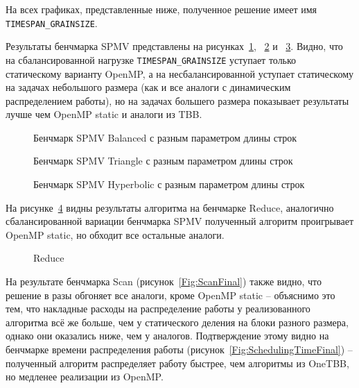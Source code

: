 \documentclass[times,specification,annotation]{itmo-student-thesis}
\begin{document}
На всех графиках, представленные ниже, полученное решение имеет имя \texttt{TIMESPAN\_GRAINSIZE}.

Результаты бенчмарка SPMV представлены на рисунках~\ref{Fig:SpmvBalancedFinal}, ~\ref{Fig:SpmvTriangleFinal} и ~\ref{Fig:SpmvHyperFinal}. Видно, что на сбалансированной нагрузке \texttt{TIMESPAN\_GRAINSIZE} уступает только статическому варианту OpenMP, а на несбалансированной уступает статическому на задачах небольшого размера (как и все аналоги с динамическим распределением работы), но на задачах большего размера показывает результаты лучше чем OpenMP static и аналоги из TBB. 

\begin{figure}[t!]
\centering

\caption{Бенчмарк SPMV Balanced с разным параметром длины строк}\label{Fig:SpmvBalancedFinal}
\end{figure}

\begin{figure}[t!]
\centering

\caption{Бенчмарк SPMV Triangle с разным параметром длины строк}\label{Fig:SpmvTriangleFinal}
\end{figure}

\begin{figure}[t!]
\centering

\caption{Бенчмарк SPMV Hyperbolic с разным параметром длины строк}\label{Fig:SpmvHyperFinal}
\end{figure}

На рисунке~\ref{Fig:ReduceFinal} видны результаты алгоритма на бенчмарке Reduce, аналогично сбалансированной вариации бенчмарка SPMV полученный алгоритм проигрывает OpenMP static, но обходит все остальные аналоги.

\begin{figure}[!t]
    \centering
        
    \caption{Reduce}\label{Fig:ReduceFinal}
\end{figure}

На результате бенчмарка Scan (рисунок~\ref{Fig:ScanFinal}) также видно, что решение в разы обгоняет все аналоги, кроме OpenMP static -- объяснимо это тем, что накладные расходы на распределение работы у реализованного алгоритма всё же больше, чем у статического деления на блоки разного размера, однако они оказались ниже, чем у аналогов. Подтверждение этому видно на бенчмарке времени распределения работы (рисунок~\ref{Fig:SchedulingTimeFinal}) -- полученный алгоритм распределяет работу быстрее, чем алгоритмы из OneTBB, но медленее реализации из OpenMP.
\end{document}
